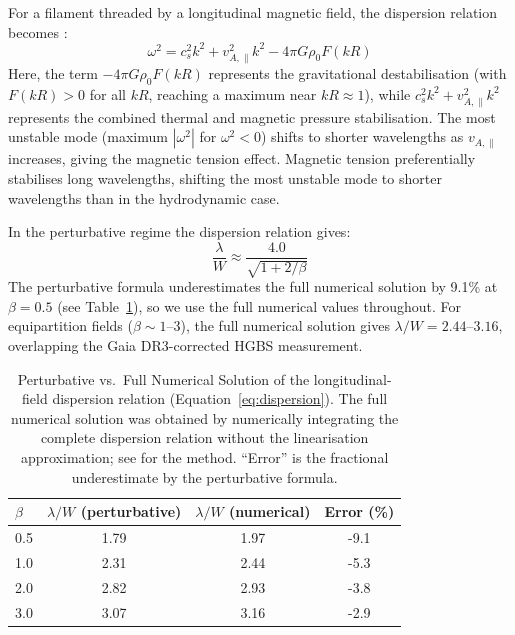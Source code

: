 \documentclass[twoside,twocolumn]{mnras}
\begin{document}
For a filament threaded by a longitudinal magnetic field, the dispersion relation
becomes \citep{Nakamura1993}:
\begin{equation}
\omega^2 = c_s^2 k^2 + v_{A,\parallel}^2 k^2 - 4\pi G\rho_0 F(kR)
\label{eq:dispersion}
\end{equation}
Here, the term $-4\pi G\rho_0 F(kR)$ represents the gravitational destabilisation (with $F(kR) > 0$ for all $kR$, reaching a maximum near $kR \approx 1$), while $c_s^2 k^2 + v_{A,\parallel}^2 k^2$ represents the combined thermal and magnetic pressure stabilisation. The most unstable mode (maximum $|\omega^2|$ for $\omega^2 < 0$) shifts to shorter wavelengths as $v_{A,\parallel}$ increases, giving the magnetic tension effect.
Magnetic tension preferentially stabilises long wavelengths, shifting the most unstable
mode to shorter wavelengths than in the hydrodynamic case.

In the perturbative regime the dispersion relation gives:
\begin{equation}
\frac{\lambda}{W} \approx \frac{4.0}{\sqrt{1 + 2/\beta}}
\label{eq:tension}
\end{equation}
The perturbative formula underestimates the full numerical solution by 9.1\% at $\beta=0.5$
(see Table~\ref{tab:perturbative}), so we use the full numerical values throughout.
For equipartition fields ($\beta \sim 1$--$3$), the full numerical solution gives
$\lambda/W = 2.44$--$3.16$, overlapping the Gaia DR3-corrected HGBS measurement.

\begin{table}
\caption{Perturbative vs.\ Full Numerical Solution of the \citet{Nakamura1993} longitudinal-field dispersion relation (Equation~\ref{eq:dispersion}). The full numerical solution was obtained by numerically integrating the complete dispersion relation without the linearisation approximation; see \citet{Nakamura1993} for the method. ``Error'' is the fractional underestimate by the perturbative formula.}
\label{tab:perturbative}
\begin{tabular}{lccc}
\toprule
$\beta$ & $\lambda/W$ (perturbative) & $\lambda/W$ (numerical) & Error (\%) \\
\midrule
0.5 & 1.79 & 1.97 & -9.1 \\
1.0 & 2.31 & 2.44 & -5.3 \\
2.0 & 2.82 & 2.93 & -3.8 \\
3.0 & 3.07 & 3.16 & -2.9 \\
\bottomrule
\end{tabular}
\end{table}
\end{document}
